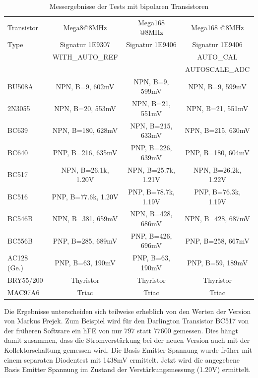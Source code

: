 \begin{table}[H]
  \begin{center}
    \begin{tabular}{| l | c | c | c |}
    \hline
 Transistor & Mega8@8MHz          & Mega168 @8MHz       & Mega168 @8MHz    \\
    Type    & Signatur 1E9307     & Signatur 1E9406     & Signatur 1E9406  \\
            & WITH\_AUTO\_REF     &                     & AUTO\_CAL        \\
            &                     &                     & AUTOSCALE\_ADC   \\
    \hline
    \hline
BU508A      & NPN, B=9, 602mV     & NPN, B=9, 599mV     & NPN, B=9, 599mV   \\
    \hline
2N3055      & NPN, B=20, 553mV    & NPN, B=21, 551mV    & NPN, B=21, 551mV  \\
    \hline
BC639       & NPN, B=180, 628mV   & NPN, B=215, 633mV   & NPN, B=215, 630mV \\
    \hline
BC640       & PNP, B=216, 635mV   & PNP, B=226, 639mV   & PNP, B=180, 604mV \\
    \hline
BC517       & NPN, B=26.1k, 1.20V & NPN, B=25.7k, 1.21V & NPN, B=26.2k, 1.22V\\
    \hline
BC516       & PNP, B=77.6k, 1.20V & PNP, B=78.7k, 1.19V & PNP, B=76.3k, 1.19V\\
    \hline
BC546B      & NPN, B=381, 659mV   & NPN, B=428, 686mV   & NPN, B=428, 687mV \\
    \hline
BC556B      & PNP, B=285, 689mV   & PNP, B=426, 696mV   & PNP, B=258, 667mV \\
    \hline
AC128 (Ge.) & PNP, B=63, 190mV    & PNP, B=63, 190mV    & PNP, B=59, 189mV  \\
    \hline
BRY55/200   & Thyristor           & Thyristor           & Thyristor        \\
    \hline
MAC97A6     & Triac               & Triac               & Triac        \\
    \hline
    \end{tabular}
  \end{center}
  \caption{Messergebnisse der Tests mit bipolaren Transistoren}
  \label{tab:bipolar} 
\end{table}

Die Ergebnisse unterscheiden sich teilweise erheblich von den Werten der Version 
von Markus Frejek. Zum Beispiel wird für den Darlington Transistor BC517 von
der früheren Software ein hFE von nur 797 statt 77600 gemessen. 
Dies hängt damit zusammen, dass die Stromverstärkung bei der neuen Version auch mit der
Kollektorschaltung gemessen wird.
Die Basis Emitter Spannung wurde früher mit einem separaten Diodentest mit 1438mV ermittelt.
Jetzt wird die angegebene Basis Emitter Spannung im Zustand der Verstärkungsmessung (1.20V) ermittelt.


